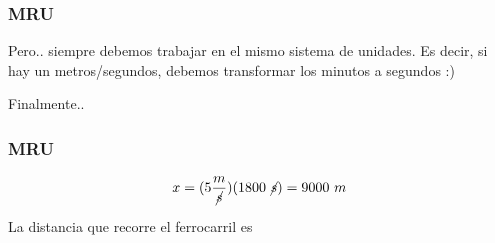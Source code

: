 \documentclass{beamer}
\begin{document}
\begin{frame}
\frametitle{MRU}
% 
{\huge \xmru}

Pero.. siempre debemos trabajar en el mismo sistema de unidades.
Es decir, si hay un metros/segundos,
debemos transformar los 
minutos a segundos :)

\begin{center}
\end{center}

Finalmente..

\end{frame}



\begin{frame}
\frametitle{MRU}
% 
{\large
\begin{equation}
x=
(5\frac{m}{\cancel{s}})
(1800~\cancel{s})=
9000~m
\end{equation}}

La distancia que recorre el ferrocarril es

\end{frame}
\end{document}

